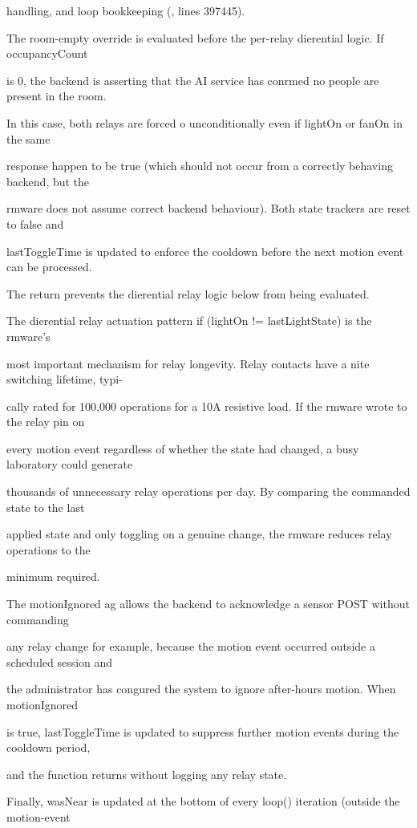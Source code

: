 handling, and loop bookkeeping (, lines 397445).

The room-empty override is evaluated before the per-relay dierential logic. If occupancyCount

is 0, the backend is asserting that the AI service has conrmed no people are present in the room.

In this case, both relays are forced o unconditionally  even if lightOn or fanOn in the same

response happen to be true (which should not occur from a correctly behaving backend, but the

rmware does not assume correct backend behaviour). Both state trackers are reset to false and

lastToggleTime is updated to enforce the cooldown before the next motion event can be processed.

The return prevents the dierential relay logic below from being evaluated.

The dierential relay actuation pattern  if (lightOn != lastLightState)  is the rmware's

most important mechanism for relay longevity. Relay contacts have a nite switching lifetime, typi-

cally rated for 100,000 operations for a 10A resistive load. If the rmware wrote to the relay pin on

every motion event regardless of whether the state had changed, a busy laboratory could generate

thousands of unnecessary relay operations per day. By comparing the commanded state to the last

applied state and only toggling on a genuine change, the rmware reduces relay operations to the

minimum required.

The motionIgnored ag allows the backend to acknowledge a sensor POST without commanding

any relay change  for example, because the motion event occurred outside a scheduled session and

the administrator has congured the system to ignore after-hours motion. When motionIgnored

is true, lastToggleTime is updated to suppress further motion events during the cooldown period,

and the function returns without logging any relay state.

Finally, wasNear is updated at the bottom of every loop() iteration (outside the motion-event

